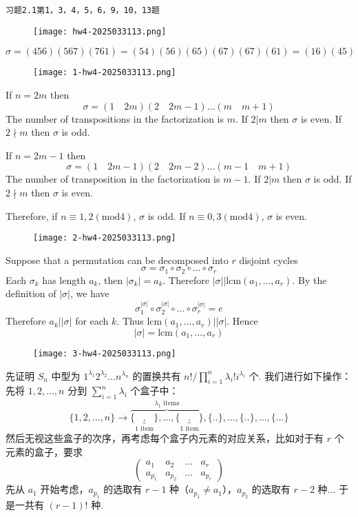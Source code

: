 \begin{lstlisting}
习题2.1第1，3，4，5，6，9，10，13题
\end{lstlisting}
\begin{figure}[H]
\centering
\texttt{[image: hw4-2025033113.png]}
\label{}
\end{figure}
\[
\sigma=(456)(567)(761)=(54)(56)(65)(67)(67)(61)=(16)(45)
\]
\begin{figure}[H]
\centering
\texttt{[image: 1-hw4-2025033113.png]}
\label{}
\end{figure}

If $n=2m$ then
\[
\sigma=(1\quad 2m)(2\quad 2m-1)\dots(m\quad m+1)
\]
The number of transpositions in the factorization is $m$. If $2|m$ then $\sigma$ is even. If $2\nmid m$ then $\sigma$ is odd.

If $n=2m-1$ then
\[
\sigma=(1\quad 2m-1)(2\quad 2m-2)\dots(m-1\quad m+1)
\]
The number of transposition in the factorization is $m-1$. If $2|m$ then $\sigma$ is odd. If $2\nmid m$ then $\sigma$ is even.

Therefore, if $n\equiv1,2(\mathrm{mod}4)$, $\sigma$ is odd. If $n\equiv0,3(\mathrm{mod}4)$, $\sigma$ is even.

\begin{figure}[H]
\centering
\texttt{[image: 2-hw4-2025033113.png]}
\label{}
\end{figure}

Suppose that a permutation can be decomposed into $r$ disjoint cycles
\[
\sigma=\sigma_1\circ \sigma_2\circ \dots \circ \sigma_{r}
\]
Each $\sigma _k$ has length $a_k$, then $\lvert \sigma _k \rvert=a_k$. Therefore $\lvert \sigma \rvert|\mathrm{lcm}(a_1,\dots,a_{r})$. By the definition of $\lvert \sigma \rvert$, we have
\[
\sigma_1^{\lvert \sigma \rvert }\circ \sigma_2^{\lvert \sigma \rvert }\circ \dots \circ \sigma_{r}^{\lvert \sigma \rvert }=e
\]
Therefore $a_k|\lvert \sigma \rvert$ for each $k$. Thus $\mathrm{lcm}(a_1,\dots,a_{r})|\lvert \sigma \rvert$. Hence
\[
\lvert \sigma \rvert =\mathrm{lcm}(a_1,\dots,a_r)
\]
\begin{figure}[H]
\centering
\texttt{[image: 3-hw4-2025033113.png]}
\label{}
\end{figure}

先证明 $S_n$ 中型为 $1^{\lambda_1}2^{\lambda_2}\dots n^{\lambda _n}$ 的置换共有 $n!/\prod_{i=1}^{n}\lambda _i!i^{\lambda _i}$ 个. 我们进行如下操作：先将 $1,2,\dots,n$ 分到 $\sum_{i=1}^{n}\lambda _i$ 个盒子中：
\[
\{ 1,2,\dots,n \}\longrightarrow \overbrace{ \{ \underbrace{ . }_{ 1\text{ item} } \},\dots,\{ \underbrace{ . }_{ 1\text{ item} } \} }^{ \lambda_1\text{ items} },\{ .. \},\dots,\{ .. \},\dots,\{ \dots \}
\]
然后无视这些盒子的次序，再考虑每个盒子内元素的对应关系，比如对于有 $r$ 个元素的盒子，要求
\[
\begin{pmatrix}
a_1 & a_2 & \dots & a_{r} \\
a_{p_1} & a_{p_2} & \dots & a_{p_{r}}
\end{pmatrix}
\]
先从 $a_1$ 开始考虑，$a_{p_1}$ 的选取有 $r-1$ 种（$a_{p_1}\neq a_1$），$a_{p_2}$ 的选取有 $r-2$ 种... 于是一共有 $(r-1)!$ 种.

